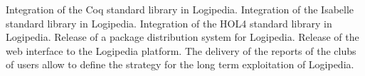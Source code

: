 

\begin{milestones}
   {Integration of the Coq standard library in Logipedia.}
   {Integration of the Isabelle standard library in Logipedia.}
   {Integration of the HOL4 standard library in Logipedia.}
   {Release of a package distribution system for Logipedia.}
  {Release of the web interface to the Logipedia platform.}
   {The delivery of the reports of the clubs of users allow to define
     the strategy for the long term exploitation of Logipedia.}
\end{milestones}

